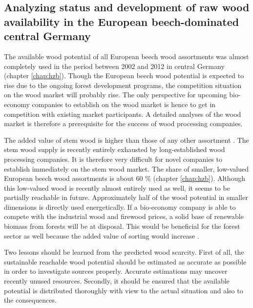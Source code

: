 \subsection{Analyzing status and development of raw wood availability in the European beech-dominated central Germany}
\label{subsec:discussion:struct:hzb}
The available wood potential of all European beech wood assortments was almost completely used in the period between 2002 and 2012 in central Germany (chapter \ref{chap:hzb}). Though the European beech wood potential is expected to rise due to the ongoing forest development programs, the competition situation on the wood market will probably rise. The only perspective for upcoming bio-economy companies to establish on the wood market is hence to get in competition with existing market participants. A detailed analyses of the wood market is therefore a prerequisite for the success of wood processing companies.

The added value of stem wood is higher than those of any other assortment \citep{nagel_2008}. The stem wood supply is recently entirely exhausted by long-established wood processing companies. It is therefore very difficult for novel companies to establish immediately on the stem wood market. The share of smaller, low-valued European beech wood assortments is about 60 \% (chapter \ref{chap:hzb}). Although this low-valued wood is recently almost entirely used as well, it seems to be partially reachable in future. Approximately half of the wood potential in smaller dimensions is directly used energetically. If a bio-economy company is able to compete with the industrial wood and firewood prices, a solid base of renewable biomass from forests will be at disposal. This would be beneficial for the forest sector as well because the added value of sorting would increase \cite[p. 67]{mohring_1997}.

Two lessons should be learned from the predicted wood scarcity. First of all, the sustainable reachable wood potential should be estimated as accurate as possible in order to investigate sources properly. Accurate estimations may uncover recently unused resources. Secondly, it should be ensured that the available potential is distributed thoroughly with view to the actual situation and also to the consequences.

